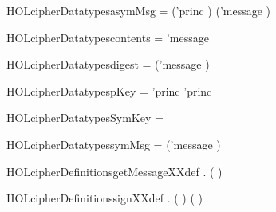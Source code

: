 \newcommand{\HOLcipherDate}{20 August 2016}
\newcommand{\HOLcipherTime}{12:36}
\begin{SaveVerbatim}{HOLcipherDatatypesasymMsg}
 =  ('princ ) ('message )
\end{SaveVerbatim}
\newcommand{\HOLcipherDatatypesasymMsg}{\UseVerbatim{HOLcipherDatatypesasymMsg}}
\begin{SaveVerbatim}{HOLcipherDatatypescontents}
 =  'message \HOLTokenBar{} 
\end{SaveVerbatim}
\newcommand{\HOLcipherDatatypescontents}{\UseVerbatim{HOLcipherDatatypescontents}}
\begin{SaveVerbatim}{HOLcipherDatatypesdigest}
 =  ('message )
\end{SaveVerbatim}
\newcommand{\HOLcipherDatatypesdigest}{\UseVerbatim{HOLcipherDatatypesdigest}}
\begin{SaveVerbatim}{HOLcipherDatatypespKey}
 =  'princ \HOLTokenBar{}  'princ
\end{SaveVerbatim}
\newcommand{\HOLcipherDatatypespKey}{\UseVerbatim{HOLcipherDatatypespKey}}
\begin{SaveVerbatim}{HOLcipherDatatypesSymKey}
 =  
\end{SaveVerbatim}
\newcommand{\HOLcipherDatatypesSymKey}{\UseVerbatim{HOLcipherDatatypesSymKey}}
\begin{SaveVerbatim}{HOLcipherDatatypessymMsg}
 =   ('message )
\end{SaveVerbatim}
\newcommand{\HOLcipherDatatypessymMsg}{\UseVerbatim{HOLcipherDatatypessymMsg}}
\newcommand{\HOLcipherDatatypes}{
\HOLcipherDatatypesasymMsg\HOLcipherDatatypescontents\HOLcipherDatatypesdigest\HOLcipherDatatypespKey\HOLcipherDatatypesSymKey\HOLcipherDatatypessymMsg}
\begin{SaveVerbatim}{HOLcipherDefinitionsgetMessageXXdef}
\HOLTokenTurnstile{} \HOLSymConst{\HOLTokenForall{}}.  ( ) \HOLSymConst{=} 
\end{SaveVerbatim}
\newcommand{\HOLcipherDefinitionsgetMessageXXdef}{\UseVerbatim{HOLcipherDefinitionsgetMessageXXdef}}
\begin{SaveVerbatim}{HOLcipherDefinitionssignXXdef}
\HOLTokenTurnstile{} \HOLSymConst{\HOLTokenForall{}} .    \HOLSymConst{=}  ( ) ( )
\end{SaveVerbatim}
